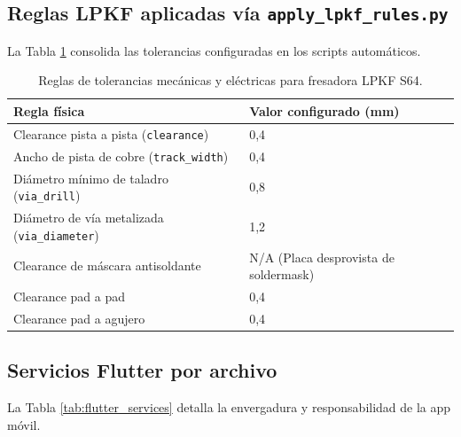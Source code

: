 \documentclass[letterpaper,11pt]{article}
\newcommand{\rtabla}[1]{Tabla \ref{#1}}
\begin{document}
\subsection{Reglas LPKF aplicadas vía \texttt{apply\_lpkf\_rules.py}}\label{sec:anexo_lpkf}

La \rtabla{tab:lpkf_rules} consolida las tolerancias configuradas en los scripts automáticos.

\begin{table}[H]
\centering
\caption{Reglas de tolerancias mecánicas y eléctricas para fresadora LPKF S64.}
\label{tab:lpkf_rules}
\small
\begin{tabular}{ll}
\toprule
\textbf{Regla física} & \textbf{Valor configurado (mm)} \\
\midrule
Clearance pista a pista (\texttt{clearance}) & 0,4 \\
Ancho de pista de cobre (\texttt{track\_width}) & 0,4 \\
Diámetro mínimo de taladro (\texttt{via\_drill}) & 0,8 \\
Diámetro de vía metalizada (\texttt{via\_diameter}) & 1,2 \\
Clearance de máscara antisoldante & N/A (Placa desprovista de soldermask) \\
Clearance pad a pad & 0,4 \\
Clearance pad a agujero & 0,4 \\
\bottomrule
\end{tabular}
\end{table}

\newpage

\subsection{Servicios Flutter por archivo}\label{sec:anexo_flutter_servicios}

La \rtabla{tab:flutter_services} detalla la envergadura y responsabilidad de la app móvil.
\end{document}
